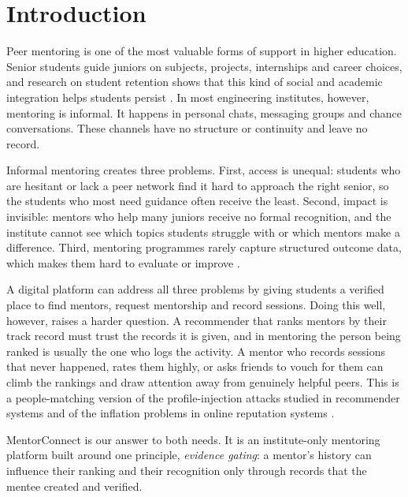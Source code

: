 \documentclass[12pt,a4paper]{report}
\begin{document}
\clearpage
{}

\chapter{Introduction}
Peer mentoring is one of the most valuable forms of support in higher education. Senior students guide juniors on subjects, projects, internships and career choices, and research on student retention shows that this kind of social and academic integration helps students persist \cite{tinto1993}. In most engineering institutes, however, mentoring is informal. It happens in personal chats, messaging groups and chance conversations. These channels have no structure or continuity and leave no record.

Informal mentoring creates three problems. First, access is unequal: students who are hesitant or lack a peer network find it hard to approach the right senior, so the students who most need guidance often receive the least. Second, impact is invisible: mentors who help many juniors receive no formal recognition, and the institute cannot see which topics students struggle with or which mentors make a difference. Third, mentoring programmes rarely capture structured outcome data, which makes them hard to evaluate or improve \cite{gershenfeld2014}.

A digital platform can address all three problems by giving students a verified place to find mentors, request mentorship and record sessions. Doing this well, however, raises a harder question. A recommender that ranks mentors by their track record must trust the records it is given, and in mentoring the person being ranked is usually the one who logs the activity. A mentor who records sessions that never happened, rates them highly, or asks friends to vouch for them can climb the rankings and draw attention away from genuinely helpful peers. This is a people-matching version of the profile-injection attacks studied in recommender systems \cite{lam2004,mobasher2007} and of the inflation problems in online reputation systems \cite{resnick2000,josang2007}.

MentorConnect is our answer to both needs. It is an institute-only mentoring platform built around one principle, \emph{evidence gating}: a mentor's history can influence their ranking and their recognition only through records that the mentee created and verified.
\end{document}
